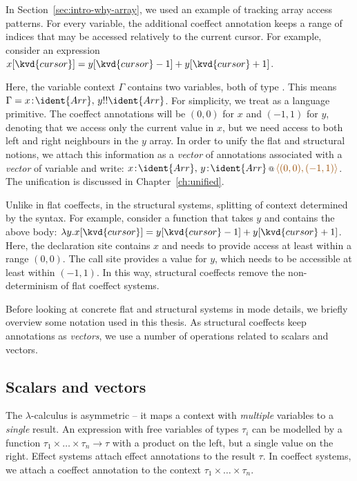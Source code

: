 In Section~\ref{sec:intro-why-array}, we used an example of tracking array access patterns. For every
variable, the additional coeffect annotation keeps a range of indices that may be accessed relatively
to the current cursor. For example, consider an expression 
$x[\kvd{cursor}] = y[\kvd{cursor}-1] + y[\kvd{cursor}+1]$.

Here, the variable context $\Gamma$ contains two variables, both of type . This means
$\Gamma = x\!:\!\ident{Arr},\, y\-!\-!\ident{Arr}$. For simplicity, we treat  as a 
language primitive. The coeffect annotations will be $(0,0)$ for $x$ and $(-1,1)$ for $y$, 
denoting that we access only the current value in $x$, but we need access to both left and right 
neighbours in the $y$ array. In order to unify the flat and structural notions, we attach this information 
as a \emph{vector} of annotations associated with a \emph{vector} of variable and write:
$\coctx{x\!:\!\ident{Arr},\, y\!:\!\ident{Arr}}{ \aclrd{\alift{ (0,0), (-1,1) }} }$.
The unification is discussed in Chapter~\ref{ch:unified}.

Unlike in flat coeffects, in the structural systems, splitting of context determined by the syntax. 
For example, consider a function that takes $y$ and contains the above body:
$\lambda y.x[\kvd{cursor}] = y[\kvd{cursor}-1] + y[\kvd{cursor}+1]$. Here, the declaration site
contains $x$ and needs to provide access at least within a range $(0,0)$. The call site provides
a value for $y$, which needs to be accessible at least within $(-1, 1)$. In this way, structural
coeffects remove the non-determinism of flat coeffect systems.

Before looking at concrete flat and structural systems in mode details, we briefly overview 
some notation used in this thesis. As structural coeffects keep annotations as \emph{vectors},
we use a number of operations related to scalars and vectors.


\subsection{Scalars and vectors}
\label{sec:applications-strucutre-vec}

The $\lambda$-calculus is asymmetric -- it maps a context with \emph{multiple} variables to a 
\emph{single} result. An expression with free variables of types $\tau_i$ can be modelled by a function 
$\tau_1 \times \ldots \times \tau_n \rightarrow \tau$ with a product on the left, but a single value
on the right. Effect systems attach effect annotations to the result $\tau$. In coeffect systems,
we attach a coeffect annotation to the context $\tau_1 \times \ldots \times \tau_n$.

